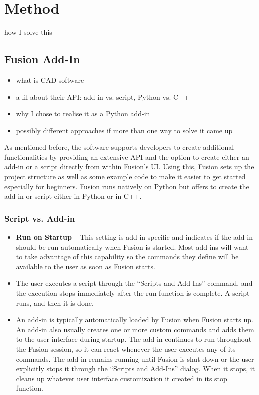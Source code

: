 \chapter{Method}\label{ch:method}

how I solve this 

\section{Fusion Add-In}

\begin{itemize}
    \item what is CAD software 
    \item a lil about their API: add-in vs. script, Python vs. C++
    \item why I chose to realise it as a Python add-in
    \item possibly different approaches if more than one way to solve it came up 
\end{itemize}

As mentioned before, the software supports developers to create additional functionalities by providing an extensive API and the option to create either an add-in or a script directly from within Fusion's UI. 
Using this, Fusion sets up the project structure as well as some example code to make it easier to get started especially for beginners. 
Fusion runs natively on Python but offers to create the add-in or script either in Python or in C++. 

\subsection{Script vs. Add-in}\cite{autodesk_inc_fusion_2025-1}
\begin{itemize}
    \item \textbf{Run on Startup} – This setting is add-in-specific and indicates if the add-in should be run automatically when Fusion is started.  Most add-ins will want to take advantage of this capability so the commands they define will be available to the user as soon as Fusion starts.
    \item The user executes a script through the “Scripts and Add-Ins” command, and the execution stops immediately after the run function is complete. A script runs, and then it is done.
    \item An add-in is typically automatically loaded by Fusion when Fusion starts up. An add-in also usually creates one or more custom commands and adds them to the user interface during startup. The add-in continues to run throughout the Fusion session, so it can react whenever the user executes any of its commands. The add-in remains running until Fusion is shut down or the user explicitly stops it through the “Scripts and Add-Ins” dialog. When it stops, it cleans up whatever user interface customization it created in its stop function.
\end{itemize}

